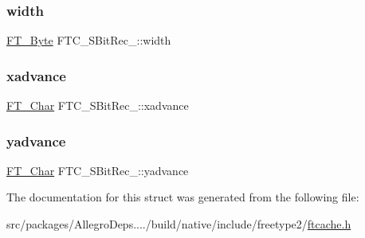 \subsubsection{\texorpdfstring{width}{width}}
{\footnotesize\ttfamily \hyperlink{fttypes_8h_a51f26183ca0c9f4af958939648caeccd}{F\+T\+\_\+\+Byte} F\+T\+C\+\_\+\+S\+Bit\+Rec\+\_\+\+::width}

\mbox{\label{struct_f_t_c___s_bit_rec___a502a0bb69d973d2ae626a842eb9fefd3}} 
\subsubsection{\texorpdfstring{xadvance}{xadvance}}
{\footnotesize\ttfamily \hyperlink{fttypes_8h_a0f851552b050883885f0a0855771f39d}{F\+T\+\_\+\+Char} F\+T\+C\+\_\+\+S\+Bit\+Rec\+\_\+\+::xadvance}

\mbox{\label{struct_f_t_c___s_bit_rec___aabe767ddaf7ff62918886c6f62e9ac28}} 
\subsubsection{\texorpdfstring{yadvance}{yadvance}}
{\footnotesize\ttfamily \hyperlink{fttypes_8h_a0f851552b050883885f0a0855771f39d}{F\+T\+\_\+\+Char} F\+T\+C\+\_\+\+S\+Bit\+Rec\+\_\+\+::yadvance}



The documentation for this struct was generated from the following file\+:\begin{DoxyCompactItemize}
\item 
src/packages/\+Allegro\+Deps..../build/native/include/freetype2/\hyperlink{ftcache_8h}{ftcache.\+h}\end{DoxyCompactItemize}
